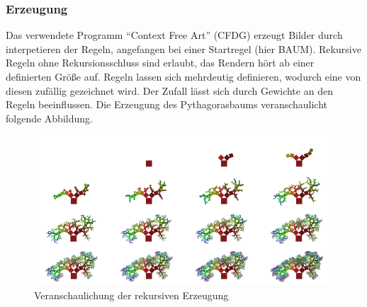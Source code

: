 \subsubsection{Erzeugung}
Das verwendete Programm ``Context Free Art'' (CFDG) erzeugt Bilder durch interpetieren der Regeln,
angefangen bei einer Startregel (hier BAUM). Rekursive Regeln ohne Rekursionsschluss sind erlaubt,
das Rendern hört ab einer definierten Größe auf. Regeln lassen sich mehrdeutig definieren,
wodurch eine von diesen zufällig gezeichnet wird. Der Zufall lässt sich durch Gewichte an den Regeln beeinflussen.
Die Erzeugung des Pythagorasbaums veranschaulicht folgende Abbildung.
\begin{figure}[ht]
\centering
 \includegraphics[width=\textwidth, height=.5\textwidth]{steps.png}
\caption{Veranschaulichung der rekursiven Erzeugung}
\end{figure}

\clearpage
\newpage
